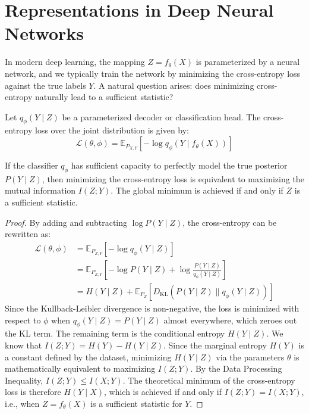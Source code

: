 \section{Representations in Deep Neural Networks}

In modern deep learning, the mapping $Z = f_\theta(X)$ is parameterized by a neural network, and we typically train the network by minimizing the cross-entropy loss against the true labels $Y$. A natural question arises: does minimizing cross-entropy naturally lead to a sufficient statistic?

Let $q_\phi(Y \mid Z)$ be a parameterized decoder or classification head. The cross-entropy loss over the joint distribution is given by:
\[ \mathcal{L}(\theta, \phi) = \mathbb{E}_{P_{X,Y}} [-\log q_\phi(Y \mid f_\theta(X))] \]

\begin{theorem}
If the classifier $q_\phi$ has sufficient capacity to perfectly model the true posterior $P(Y \mid Z)$, then minimizing the cross-entropy loss is equivalent to maximizing the mutual information $I(Z; Y)$. The global minimum is achieved if and only if $Z$ is a sufficient statistic.
\end{theorem}
\begin{proof}
By adding and subtracting $\log P(Y \mid Z)$, the cross-entropy can be rewritten as:
\begin{align*}
\mathcal{L}(\theta, \phi) &= \mathbb{E}_{P_{Z,Y}} [-\log q_\phi(Y \mid Z)] \\
&= \mathbb{E}_{P_{Z,Y}} \left[-\log P(Y \mid Z) + \log \frac{P(Y \mid Z)}{q_\phi(Y \mid Z)} \right] \\
&= H(Y \mid Z) + \mathbb{E}_{P_Z} [D_{\text{KL}}(P(Y \mid Z) \parallel q_\phi(Y \mid Z))]
\end{align*}
Since the Kullback-Leibler divergence is non-negative, the loss is minimized with respect to $\phi$ when $q_\phi(Y \mid Z) = P(Y \mid Z)$ almost everywhere, which zeroes out the KL term.
The remaining term is the conditional entropy $H(Y \mid Z)$. We know that $I(Z; Y) = H(Y) - H(Y \mid Z)$. Since the marginal entropy $H(Y)$ is a constant defined by the dataset, minimizing $H(Y \mid Z)$ via the parameters $\theta$ is mathematically equivalent to maximizing $I(Z; Y)$. 
By the Data Processing Inequality, $I(Z; Y) \le I(X; Y)$. The theoretical minimum of the cross-entropy loss is therefore $H(Y \mid X)$, which is achieved if and only if $I(Z; Y) = I(X; Y)$, i.e., when $Z = f_\theta(X)$ is a sufficient statistic for $Y$.
\end{proof}

